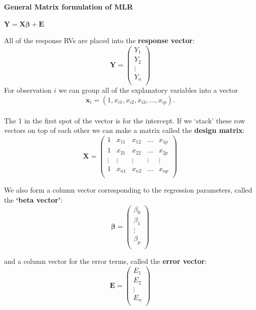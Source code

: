 \Large \textbf{General Matrix formulation of MLR}\large\\
\begin{center}
$\textbf{Y} = \textbf{X}\boldsymbol{\beta} + \textbf{E}$
\end{center}
All of the response RVs are placed into the \textbf{response vector}:
$$\textbf{Y}=\left(\begin{array}{c}
Y_1\\
Y_2\\
\vdots\\
Y_n\\
\end{array}\right)$$
For observation $i$ we can group all of the explanatory variables into a vector
$$\textbf{x}_{i} = (1,x_{i1},x_{i2},x_{i3},\ldots,x_{ip}).$$~\\
The 1 in the first spot of the vector is for the intercept.  If we `stack' these row vectors on top of each other we can make a matrix called the \textbf{design matrix}:
$$
\textbf{X}=\left(\begin{array}{ccccc}
1  &  x_{11}  &   x_{12} & \ldots & x_{1p} \\
1  &  x_{21}  &   x_{22} & \ldots & x_{2p} \\
\vdots &\vdots &\vdots &\vdots &\vdots \\ 
1  &  x_{n1}  &   x_{n2} & \ldots & x_{np} \\
\end{array}\right)$$


We also form a column vector corresponding to the regression parameters, called the \textbf{`beta vector'}:
$$\boldsymbol{\beta}=\left(\begin{array}{c}
\beta_0\\
\beta_1\\
\vdots\\
\beta_p\\
\end{array}\right)$$

and a column vector for the error terms, called the \textbf{error vector}:
$$\textbf{E}=\left(\begin{array}{c}
E_1\\
E_2\\
\vdots\\
E_n\\
\end{array}\right)$$


